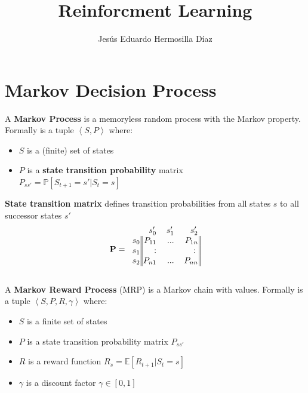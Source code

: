 \documentclass[journal]{IEEEtran}
\begin{document}
\title{Reinforcment Learning}
\author{Jesús Eduardo Hermosilla Díaz}
\maketitle

\section{Markov Decision Process}	

A \textbf{Markov Process} is a memoryless random process with the Markov property. Formally is a tuple $\left\langle S,P\right\rangle$ where:
\begin{itemize}
	\item $S$ is a (finite) set of states
	\item $P$ is a \textbf{state transition probability} matrix \\
	 $P_{ss'} = \mathbb{P}[S_{t+1}=s'|S_t=s]$
\end{itemize}

\textbf{State transition matrix} defines transition probabilities from all
states $s$ to all successor states $s'$
\begin{align*}
\mathbf{P} = 
\begin{blockarray}{c@{\hspace{1pt}}rrr@{\hspace{3pt}}}
& s_0' & s_1' & s_2' \\
\begin{block}{r@{\hspace{1pt}}|@{\hspace{1pt}}
	|@{\hspace{1pt}}rrr@{\hspace{1pt}}|@{\hspace{1pt}}|}
s_0 & P_{11} & ... & P_{1n} \\
s_1 & : &  & : \\
s_2 & P_{n1} & ... & P_{nn}   \\
\end{block}
\end{blockarray}
\end{align*}

A \textbf{Markov Reward Process} (MRP) is a Markov chain with values. Formally is a tuple $\left\langle S, P, R, \gamma \right\rangle$ where:
\begin{itemize}
	\item $S$ is a finite set of states
	\item $P$ is a state transition probability matrix $P_{ss'}$
	\item $R$ is a reward function $R_s = \mathbb{E}[R_{t+1}|S_t=s]$
	\item $\gamma$ is a discount factor $\gamma \in [0,1]$ 
\end{itemize}
\end{document}
